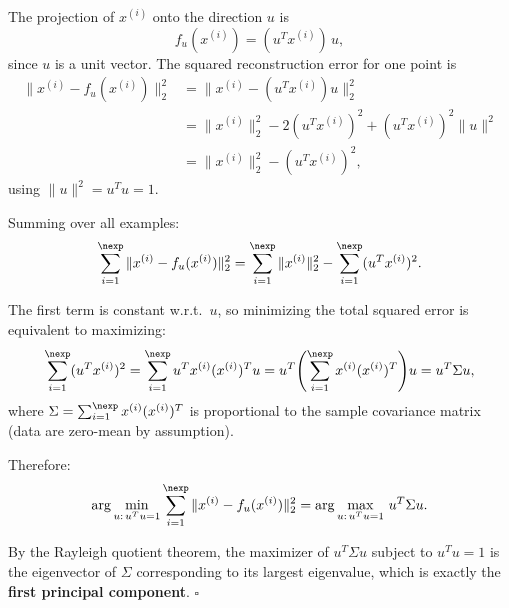 \begin{answer}
The projection of $x^{(i)}$ onto the direction $u$ is
$$f_u(x^{(i)}) = (u^T x^{(i)})\,u,$$
since $u$ is a unit vector. The squared reconstruction error for one point is
\begin{align*}
\|x^{(i)} - f_u(x^{(i)})\|_2^2
&= \|x^{(i)} - (u^T x^{(i)})u\|_2^2 \\
&= \|x^{(i)}\|_2^2 - 2(u^T x^{(i)})^2 + (u^T x^{(i)})^2 \|u\|^2 \\
&= \|x^{(i)}\|_2^2 - (u^T x^{(i)})^2,
\end{align*}
using $\|u\|^2 = u^Tu = 1$.

Summing over all examples:
$$\sum_{i=1}^\nexp \|x^{(i)} - f_u(x^{(i)})\|_2^2 = \sum_{i=1}^\nexp \|x^{(i)}\|_2^2 - \sum_{i=1}^\nexp (u^T x^{(i)})^2.$$

The first term is constant w.r.t.\ $u$, so minimizing the total squared error is equivalent to maximizing:
$$\sum_{i=1}^\nexp (u^T x^{(i)})^2 = \sum_{i=1}^\nexp u^T x^{(i)}(x^{(i)})^T u = u^T \!\left(\sum_{i=1}^\nexp x^{(i)}(x^{(i)})^T\right)\! u = u^T \Sigma u,$$
where $\Sigma = \sum_{i=1}^\nexp x^{(i)}(x^{(i)})^T$ is proportional to the sample covariance matrix (data are zero-mean by assumption).

Therefore:
$$\arg\min_{u:\,u^Tu=1}\sum_{i=1}^\nexp \|x^{(i)}-f_u(x^{(i)})\|_2^2 = \arg\max_{u:\,u^Tu=1}\, u^T\Sigma u.$$

By the Rayleigh quotient theorem, the maximizer of $u^T\Sigma u$ subject to $u^Tu=1$ is the eigenvector of $\Sigma$ corresponding to its largest eigenvalue, which is exactly the \textbf{first principal component}. $\square$
\end{answer}
